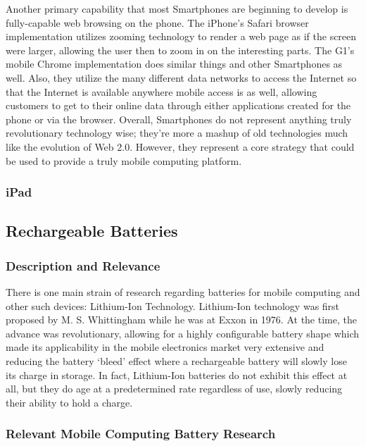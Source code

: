 \documentclass[12pt,oneside,letterpaper,titlepage]{article}
\begin{document}
Another primary capability that most Smartphones are beginning to develop is
fully-capable web browsing on the phone.  The iPhone's Safari browser
implementation utilizes zooming technology to render a web page as if the screen
were larger, allowing the user then to zoom in on the interesting parts.  The
G1's mobile Chrome implementation does similar things and other Smartphones as
well.  Also, they utilize the many different data networks to access the
Internet so that the Internet is available anywhere mobile access is as well,
allowing customers to get to their online data through either applications
created for the phone or via the browser.  Overall, Smartphones do not represent
anything truly revolutionary technology wise; they're more a mashup of old
technologies much like the evolution of Web 2.0.  However, they represent a core
strategy that could be used to provide a truly mobile computing platform.

\subsubsection{iPad}


\subsection{Rechargeable Batteries}

\subsubsection{Description and Relevance}

There is one main strain of research regarding batteries for mobile computing
and other such devices: Lithium-Ion Technology.  Lithium-Ion technology was
first proposed by M. S. Whittingham while he was at Exxon in 1976.  At the time,
the advance was revolutionary, allowing for a highly configurable battery shape
which made its applicability in the mobile electronics market very extensive and
reducing the battery `bleed' effect where a rechargeable battery will slowly
lose its charge in storage.  In fact, Lithium-Ion batteries do not exhibit this
effect at all, but they do age at a predetermined rate regardless of use, slowly
reducing their ability to hold a charge.

\subsubsection{Relevant Mobile Computing Battery Research}
\end{document}
